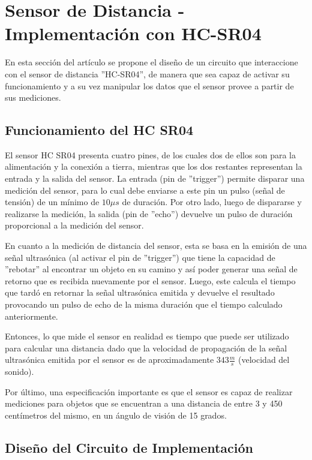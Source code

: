 \section{Sensor de Distancia - Implementación con HC-SR04}

En esta sección del artículo se propone el diseño de un circuito que
interaccione con el sensor de distancia ''HC-SR04'', de manera que
sea capaz de activar su funcionamiento y a su vez manipular los datos
que el sensor provee a partir de sus mediciones. 

\subsection{Funcionamiento del HC SR04}

El sensor HC SR04 presenta cuatro pines, de los cuales dos de ellos
son para la alimentación y la conexión a tierra, mientras que los
dos restantes representan la entrada y la salida del sensor. La entrada
(pin de ''trigger'') permite disparar una medición del sensor, para
lo cual debe enviarse a este pin un pulso (señal de tensión) de un
mínimo de $10\mu s$ de duración. Por otro lado, luego de dispararse
y realizarse la medición, la salida (pin de ''echo'') devuelve un
pulso de duración proporcional a la medición del sensor.

En cuanto a la medición de distancia del sensor, esta se basa en la
emisión de una señal ultrasónica (al activar el pin de ''trigger'')
que tiene la capacidad de ''rebotar'' al encontrar un objeto en
su camino y así poder generar una señal de retorno que es recibida
nuevamente por el sensor. Luego, este calcula el tiempo que tardó
en retornar la señal ultrasónica emitida y devuelve el resultado
provocando un pulso de echo de la misma duración que el tiempo calculado
anteriormente.

Entonces, lo que mide el sensor en realidad es tiempo que puede ser
utilizado para calcular una distancia dado que la velocidad de propagación
de la señal ultrasónica emitida por el sensor es de aproximadamente
$343\frac{m}{s}$ (velocidad del sonido).

Por último, una especificación importante es que el sensor es capaz
de realizar mediciones para objetos que se encuentran a una distancia
de entre 3 y 450 centímetros del mismo, en un ángulo de visión de
15 grados.

\subsection{Diseño del Circuito de Implementación}

